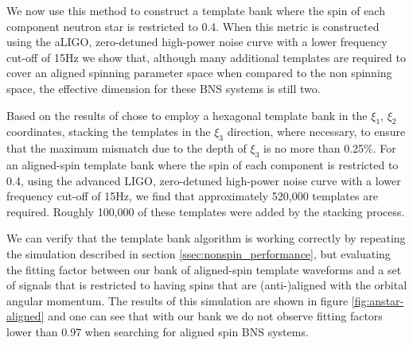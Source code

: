 We now use this method to construct a template bank where the spin of each
component neutron star is restricted to 0.4. When this metric is constructed
using the aLIGO, zero-detuned high-power noise curve with a lower
frequency cut-off of 15Hz we show that, although many additional templates are
required to cover an aligned spinning parameter space when compared to the non
spinning space, the effective dimension for these BNS systems is still two.

Based on the results of \cite{Brown:2012qf} chose to employ a hexagonal template bank in the $\xi_1$, $\xi_2$ coordinates, stacking the
templates in the $\xi_3$ direction, where necessary, to ensure that the maximum mismatch due to the depth
of $\xi_3$ is no more
than 0.25\%. For an aligned-spin template bank where the spin of each component is restricted to 0.4,
using the advanced LIGO, zero-detuned high-power noise curve with a lower frequency cut-off of 15Hz,
we find that approximately 520,000 templates are required.
Roughly 100,000 of these templates were added by the stacking process.

We can verify that the template bank algorithm is working correctly by repeating the simulation described
in section \ref{ssec:nonspin_performance}, but evaluating the fitting factor between our bank of aligned-spin
template waveforms and a set of signals that is restricted to having spins that are (anti-)aligned with the
orbital angular momentum. The results of this simulation are shown in figure \ref{fig:anstar-aligned} and
one can see that with our bank we do not observe fitting factors lower than 0.97 when searching for aligned
spin BNS systems.


